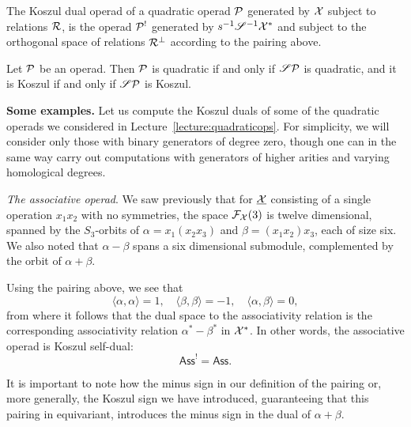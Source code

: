 \begin{definition}
The Koszul dual operad of a quadratic operad ${\mathcal{P}}$ 
generated by $\mathcal{X}$ subject to relations $\mathcal{R}$, is
the operad ${\mathcal{P}}^!$ generated by $s^{-1}\mathscr{S}^{-1}\mathcal{X}^*$ 
and subject to the orthogonal space of relations
$\mathcal{R}^\perp$ according to the pairing above.
\end{definition} 

\begin{note}
Let ${\mathcal{P}}$ be an operad. Then ${\mathcal{P}}$ is quadratic if and
only if $\mathscr{S}{\mathcal{P}}$ is quadratic, and it is Koszul if and
only if $\mathscr{S}{\mathcal{P}}$ is Koszul. 
\end{note}

\textbf{Some examples.} Let us compute the Koszul duals of 
some of the quadratic operads we considered in 
Lecture~\ref{lecture:quadraticops}.
For simplicity, we will consider only those with binary 
generators of degree zero, though one can in the same way
carry out computations with generators of higher arities and
varying homological degrees.

\bigskip

\emph{The associative operad}. We saw previously that for
$\underline{\mathcal{X}}$ consisting of a single operation
$x_1x_2$ with no symmetries, the
space $\mathcal{F}_{\mathcal{X}}(3)$ is twelve dimensional, spanned by
the $S_3$-orbits of $\alpha = x_1(x_2x_3)$ and $\beta =(x_1x_2)x_3$,
each of size six. We also noted that $\alpha-\beta$
spans a six dimensional submodule, complemented by the
orbit of $\alpha+\beta$. 

Using the pairing above, we see that
\[\langle \alpha,\alpha\rangle = 1,
	\quad \langle\beta,\beta\rangle = -1,
	\quad \langle \alpha,\beta\rangle = 0, \] 
from where it follows that the dual space to the associativity
relation is the corresponding associativity relation
$\alpha^* - \beta^*$ in $\mathcal{X}^*$. In other words,
the associative operad is Koszul self-dual:
\[\mathsf{Ass}^! = \mathsf{Ass}.\]

It is important to note how the minus sign in our
definition of the pairing or, more generally, the
Koszul sign we have introduced, guaranteeing that
this pairing in equivariant, introduces the minus sign
in the dual of $\alpha+\beta$.

\bigskip


